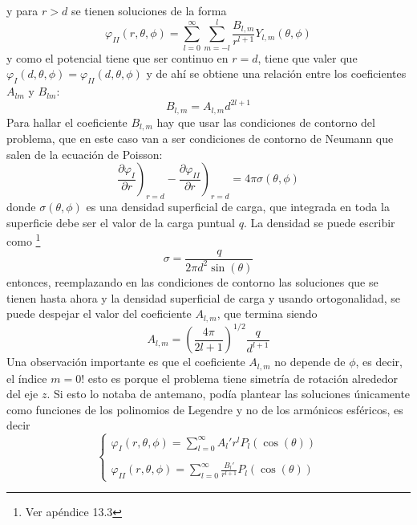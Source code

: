 y para $r>d$ se tienen soluciones de la forma
\begin{equation*}
    \varphi_{II}(r,\theta,\phi) = 
    \sum\limits_{l=0}^{\infty}
    \sum\limits_{m = -l}^{l}
    \frac{B_{l,m}}{r^{l+1}}Y_{l,m}(\theta, \phi)
\end{equation*}
y como el potencial tiene que ser continuo en $r = d$, tiene que valer que $\varphi_{I}(d,\theta,\phi) = \varphi_{II}(d,\theta,\phi)$ y de ahí se obtiene una relación entre los coeficientes $A_{lm}$ y $B_{lm}$:
\begin{equation*}
    B_{l,m} = A_{l,m}d^{2l+1}
\end{equation*}
Para hallar el coeficiente $B_{l,m}$ hay que usar las condiciones de contorno del problema, que en este caso van a ser condiciones de contorno de Neumann que salen de la ecuación de Poisson:
\begin{equation*}
    \left.
        \frac{\partial \varphi_{I}}{\partial r}
    \right)_{r = d}
    -
    \left.
        \frac{\partial \varphi_{II}}{\partial r}
    \right)_{r = d}
    = 4\pi\sigma(\theta,\phi)
\end{equation*}
donde $\sigma(\theta,\phi)$ es una densidad superficial de carga, que integrada en toda la superficie debe ser el valor de la carga puntual $q$. La densidad se puede escribir como \footnote{Ver apéndice 13.3}
\begin{equation*}
    \sigma = \frac{q}{2\pi d^{2}\sin{(\theta)}}
\end{equation*}
entonces, reemplazando en las condiciones de contorno las soluciones que se tienen hasta ahora y la densidad superficial de carga y usando ortogonalidad, se puede despejar el valor del coeficiente $A_{l,m}$, que termina siendo
\begin{equation*}
    A_{l,m} = 
    \left(
        \frac{4\pi}{2l + 1}
    \right)^{1/2}
    \frac{q}{d^{l+1}}
\end{equation*}
Una observación importante es que el coeficiente $A_{l,m}$ no depende de $\phi$, es decir, el índice $m = 0$! esto es porque el problema tiene simetría de rotación alrededor del eje $z$. Si esto lo notaba de antemano, podía plantear las soluciones únicamente como funciones de los polinomios de Legendre y no de los armónicos esféricos, es decir
\begin{equation*}
    \left\{
        \begin{matrix}
            \varphi_{I}(r,\theta,\phi) = 
            \sum\limits_{l=0}^{\infty}
            A_{l}'r^{l}P_{l}(\cos{(\theta)})\\
            \\
            \varphi_{II}(r,\theta,\phi) = 
            \sum\limits_{l=0}^{\infty}
            \frac{B_{l}'}{r^{l+1}}P_{l}(\cos{(\theta)})
        \end{matrix}
    \right.
\end{equation*}
